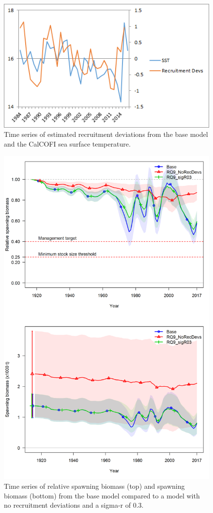 \documentclass[12pt,]{article}
\begin{document}
\newpage

\begin{figure}[htbp]
\centering
\includegraphics{Figures/Request8.png}
\caption{Time series of estimated recruitment deviations from the base
model and the CalCOFI sea surface temperature. \label{fig:Request8}}
\end{figure}

\begin{figure}[htbp]
\centering
\includegraphics[height=0.90000\textwidth]{Figures/Request9.png}
\caption{Time series of relative spawning biomass (top) and spawning
biomass (bottom) from the base model compared to a model with no
recruitment deviations and a sigma-r of 0.3. \label{fig:Request9}}
\end{figure}
\end{document}
